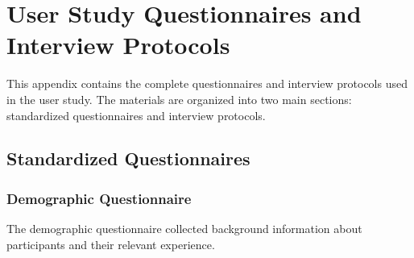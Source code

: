 \chapter{User Study Questionnaires and Interview Protocols}
\label{appendix:questionnaires}

This appendix contains the complete questionnaires and interview protocols used in the user study. The materials are organized into two main sections: standardized questionnaires and interview protocols.

\section{Standardized Questionnaires}

\subsection{Demographic Questionnaire}
\label{appendix:demographic-questionnaire}

The demographic questionnaire collected background information about participants and their relevant experience.

